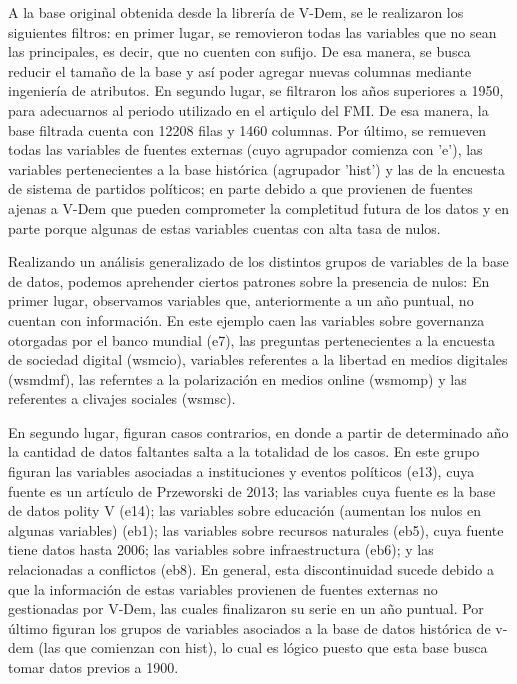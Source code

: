 \documentclass{article}
\begin{document}
A la base original obtenida desde la librería de V-Dem, se le realizaron los
siguientes filtros: en primer lugar, se removieron todas las variables que
no sean las principales, es decir, que no cuenten con sufijo. De esa manera,
se busca reducir el tamaño de la base y así poder agregar nuevas columnas
mediante ingeniería de atributos. En segundo lugar, se filtraron los años 
superiores a 1950, para adecuarnos al periodo utilizado en el artiçulo del FMI.
De esa manera, la base filtrada cuenta con 12208 filas y 1460 columnas. Por último,
se remueven todas las variables de fuentes externas (cuyo agrupador comienza con
'e'), las variables pertenecientes a la base histórica (agrupador 'hist') y las
de la encuesta de sistema de partidos políticos; en parte debido a que provienen
de fuentes ajenas a V-Dem que pueden comprometer la completitud futura de los datos
y en parte porque algunas de estas variables cuentas con alta tasa de nulos.

Realizando un análisis generalizado de los distintos grupos de variables de la base de
datos, podemos aprehender ciertos patrones sobre la presencia de nulos: 
En primer lugar, observamos variables que,
anteriormente a un año puntual, no cuentan con información. En este ejemplo caen
las variables sobre governanza otorgadas por el banco mundial (e7), las preguntas
pertenecientes a la encuesta de sociedad digital (wsmcio), variables referentes a
la libertad en medios digitales (wsmdmf), las referntes a la polarización en medios
online (wsmomp) y las referentes a clivajes sociales (wsmsc).

En segundo lugar, figuran casos contrarios, en donde a partir de determinado año
la cantidad de datos faltantes salta a la totalidad de los casos. En este grupo
figuran las variables asociadas a instituciones y eventos políticos (e13), cuya 
fuente es un artículo de Przeworski de 2013; las variables cuya fuente es la base
de datos polity V (e14); las variables sobre educación (aumentan los nulos en 
algunas variables) (eb1); las variables sobre recursos naturales (eb5), cuya fuente 
tiene datos hasta 2006; las variables sobre infraestructura (eb6); y las relacionadas 
a conflictos (eb8). En general, esta discontinuidad sucede debido a que la 
información de estas variables provienen de fuentes externas no gestionadas por 
V-Dem, las cuales finalizaron su serie en un año puntual. Por último figuran los 
grupos de variables asociados a la base de datos histórica de v-dem (las que comienzan 
con hist), lo cual es lógico puesto que esta base busca tomar datos previos a 1900.
\end{document}
